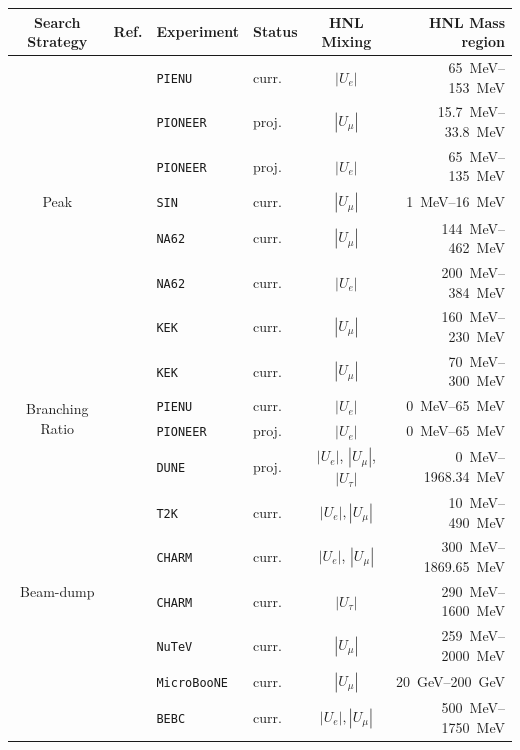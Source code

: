 \begin{table}[h!t]
\centering
\begin{tabular}{|c|lll|cr|}
\hline
Search Strategy & Ref. & Experiment &  Status & HNL Mixing  & HNL Mass region   \\
 \hline
\multirow{7}{*}{Peak} & \cite{PIENU:2017wbj}& \texttt{PIENU} & curr. & $|U_e|$ &  \SIrange{65}{153}{\MeV} \\ 
&\cite{PIONEER:2022alm} & \texttt{PIONEER} & proj. &  $|U_\mu|$& \SIrange{15.7}{33.8}{\MeV} \\
& \cite{PIONEER:2022alm} & \texttt{PIONEER} & proj. & $|U_e|$ & \SIrange{65}{135}{\MeV} \\
&\cite{Daum:1987bg} & \texttt{SIN} & curr. & $|U_\mu|$ & \SIrange{1}{16}{\MeV}\\
&\cite{NA62:2020mcv} & \texttt{NA62} & curr.   & $|U_\mu|$ & \SIrange{144}{462}{\MeV}\\
&\cite{NA62:2021bji} & \texttt{NA62} & curr.  & $|U_e|$ & \SIrange{200}{384}{\MeV}\\
&\cite{Asano:1981he}& \texttt{KEK} & curr.   & $|U_\mu|$ & \SIrange{160}{230}{\MeV} \\
&\cite{Hayano:1982wu} & \texttt{KEK} & curr.   & $|U_\mu|$ & \SIrange{70}{300}{\MeV}\\
\hline
\multirow{2}{*}{Branching Ratio} &\cite{PIENU:2017wbj} & \texttt{PIENU} &  curr. &$|U_e|$ &  \SIrange{0}{65}{\MeV} \\ 
& \cite{PIONEER:2022alm} & \texttt{PIONEER} & proj.  & $|U_e|$ & \SIrange{0}{65}{\MeV} \\
\hline
\multirow{9}{*}{Beam-dump} & \cite{Ballett:2019bgd} & \texttt{DUNE} & proj. &  $|U_e|$, $|U_\mu|$, $|U_\tau|$ & \SIrange{0}{1968.34}{\MeV} \\
& \cite{T2K:2019jwa} & \texttt{T2K} & curr. &   $|U_e|, |U_\mu|$ & \SIrange{10}{490}{\MeV} \\
& \cite{CHARM:1985nku,CHARMII:1994jjr} & \texttt{CHARM} & curr. &  $|U_e|$, $|U_\mu|$ & \SIrange{300}{1869.65}{\MeV} \\
& \cite{Orloff:2002de} & \texttt{CHARM} & curr. &  $|U_\tau|$ & \SIrange{290}{1600}{\MeV} \\
& \cite{NuTeV:1999kej} & \texttt{NuTeV} & curr. &  $|U_\mu|$ & \SIrange{259}{2000}{\MeV} \\
& \cite{Kelly:2021xbv} & \texttt{MicroBooNE} & curr. &  $|U_\mu|$ & \SIrange{20}{200}{\GeV}\\
& \cite{WA66:1985mfx} & \texttt{BEBC} & curr. &  $|U_e|, |U_\mu|$ & \SIrange{500}{1750}{\MeV}\\

\end{tabular}
\end{table}
